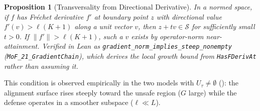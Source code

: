 \documentclass[11pt]{article}
\newtheorem{proposition}[theorem]{Proposition}
\begin{document}
\begin{proposition}[Transversality from Directional Derivative]
\label{prop:transversality}
In a normed space, if $f$ has Fr\'{e}chet derivative $f'$ at boundary
point $z$ with directional value $f'(v) > \ell(K+1)$ along a unit
vector $v$, then $z + tv \in \mathcal{S}$ for sufficiently small
$t > 0$. If $\|f'\| > \ell(K+1)$, such a $v$ exists by operator-norm
near-attainment. Verified in Lean as
\texttt{gradient\_norm\_implies\_steep\_nonempty}
(\texttt{MoF\_21\_GradientChain}), which derives the local growth
bound from \texttt{HasFDerivAt} rather than assuming it.
\end{proposition}

This condition is observed empirically in the two models with
$U_\tau \neq \emptyset$ (): the alignment
surface rises steeply toward the unsafe region ($G$ large) while the
defense operates in a smoother subspace ($\ell \ll L$).
\end{document}
